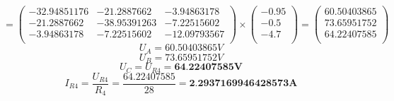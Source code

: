 \documentclass{article}
\begin{document}
\[
  =
  \begin{pmatrix}
    -32.94851176 & -21.2887662 &  -3.94863178\\
    -21.2887662 & -38.95391263 &  -7.22515602\\
    -3.94863178 &  -7.22515602 & -12.09793567\\
  \end{pmatrix}
  \times
  \begin{pmatrix}
    -0.95\\
    -0.5\\
    -4.7\\
  \end{pmatrix}
  =
  \begin{pmatrix}
    60.50403865\\
    73.65951752\\
    64.22407585\\
  \end{pmatrix}
\]
\[
  U_A = 60.50403865V
\]
\[
  U_B = 73.65951752V
\]
\[
  U_C = U_{R4} = \textbf{64.22407585V}
\]
\[
  I_{R4} = \displaystyle\frac{U_{R4}}{R_4}
  = \displaystyle\frac{64.22407585}{28}
  = \textbf{2.2937169946428573A}
\]
\end{document}
